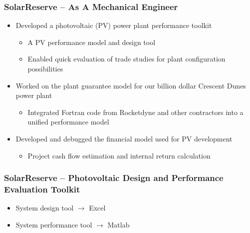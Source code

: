 \documentclass[aspectratio=169]{beamer}
\begin{document}
\begin{frame}
  \frametitle{SolarReserve -- As A Mechanical Engineer}
  \begin{itemize}
  \item Developed a photovoltaic (PV) power plant performance toolkit
    \begin{itemize}
    \item A PV performance model and design tool
    \item Enabled quick evaluation of trade studies for plant
      configuration possibilities
    \end{itemize}
  \item Worked on the plant guarantee model for our billion dollar
    Crescent Dunes power plant
    \begin{itemize}
    \item Integrated Fortran code from Rocketdyne and other
      contractors into a unified performance model
    \end{itemize}
  \item Developed and debugged the financial model used for PV development
    \begin{itemize}
    \item Project cash flow estimation and internal return calculation
    \end{itemize}
  \end{itemize}
\end{frame}

\begin{frame}
  \frametitle{SolarReserve -- Photovoltaic Design and Performance Evaluation Toolkit}
  \begin{itemize}
  \item System design tool $\rightarrow$ Excel
  \item System performance tool $\rightarrow$ Matlab
  \end{itemize}
\end{frame}
\end{document}
